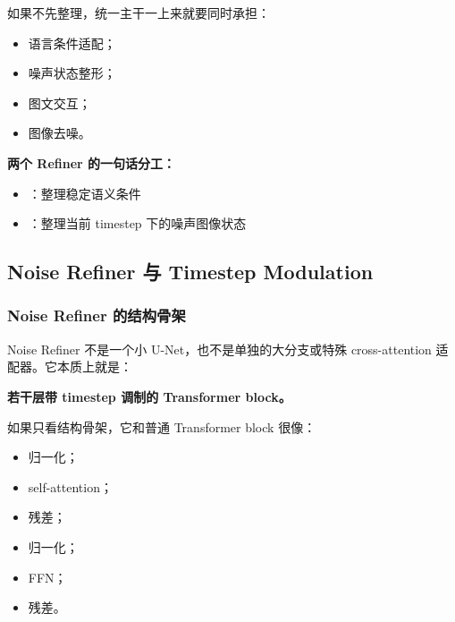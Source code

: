 如果不先整理，统一主干一上来就要同时承担：

\begin{itemize}[leftmargin=1.5em]
  \item 语言条件适配；
  \item 噪声状态整形；
  \item 图文交互；
  \item 图像去噪。
\end{itemize}

\begin{summarybox}
\textbf{两个 Refiner 的一句话分工：}\\
\begin{itemize}[leftmargin=1.5em]
  \item {}：整理稳定语义条件
  \item {}：整理当前 timestep 下的噪声图像状态
\end{itemize}
\end{summarybox}

\subsection{Noise Refiner 与 Timestep Modulation}

\subsubsection{Noise Refiner 的结构骨架}

Noise Refiner 不是一个小 U-Net，也不是单独的大分支或特殊 cross-attention 适配器。它本质上就是：

\begin{conceptbox}
\textbf{若干层带 timestep 调制的 Transformer block。}
\end{conceptbox}

如果只看结构骨架，它和普通 Transformer block 很像：

\begin{itemize}[leftmargin=1.5em]
  \item 归一化；
  \item self-attention；
  \item 残差；
  \item 归一化；
  \item FFN；
  \item 残差。
\end{itemize}

